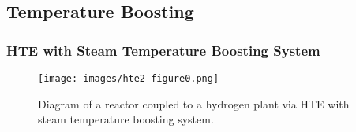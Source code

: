 \subsection{Temperature Boosting}
\begin{frame}
\frametitle{HTE with Steam Temperature Boosting System}
	\begin{figure}[htbp!]
		\begin{center}
			\texttt{[image: images/hte2-figure0.png]}
		\end{center}
		\caption{Diagram of a reactor coupled to a hydrogen plant via HTE with steam temperature boosting system.}
	\end{figure}
\end{frame}

